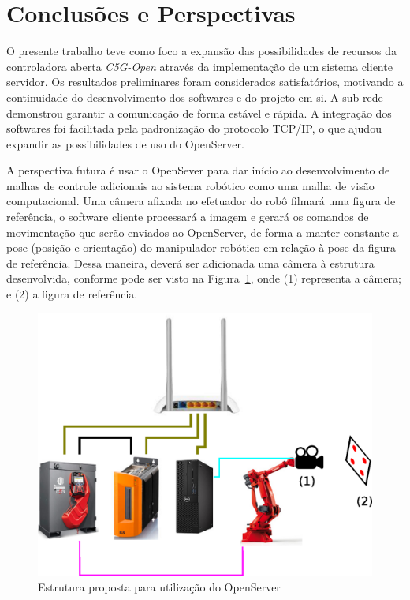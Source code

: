 \section{Conclusões e Perspectivas}

    O presente trabalho teve como foco a expansão das possibilidades de recursos da controladora aberta \textit{C5G-Open} através da implementação de um sistema cliente servidor. Os resultados preliminares foram considerados satisfatórios, motivando a continuidade do desenvolvimento dos softwares e do projeto em si. A sub-rede demonstrou garantir a comunicação de forma estável e rápida. A integração dos softwares foi facilitada pela padronização do protocolo TCP/IP, o que ajudou expandir as possibilidades de uso do OpenServer.
    
    A perspectiva futura é usar o OpenSever para dar início ao desenvolvimento de malhas de controle adicionais ao sistema robótico como uma malha de visão computacional. Uma câmera afixada no efetuador do robô filmará uma figura de referência, o software cliente processará a imagem e gerará os comandos de movimentação que serão enviados ao OpenServer, de forma a manter constante a pose (posição e orientação) do manipulador robótico em relação à pose da figura de referência. Dessa maneira, deverá ser adicionada uma câmera à estrutura desenvolvida, conforme pode ser visto na Figura~\ref{pespectiva}, onde (1) representa a câmera; e (2) a figura de referência.
    
    
    \begin{figure}[ht]
        \centering
        \includegraphics[width=\columnwidth]{imagens/pespectiva.eps}
        \small 
        \centering 
        \caption{Estrutura proposta para utilização do OpenServer}
        
        \label{pespectiva}
    \end{figure}
    
